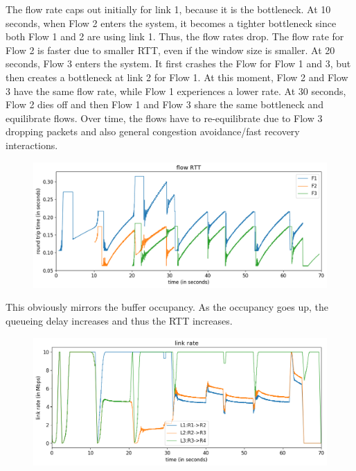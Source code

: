 \documentclass{article}
\begin{document}
The flow rate caps out initially for link 1, because it is the bottleneck. At 10 seconds, when Flow 2 enters the system, it becomes a tighter bottleneck since both Flow 1 and 2 are using link 1. Thus, the flow rates drop. The flow rate for Flow 2 is faster due to smaller RTT, even if the window size is smaller. At 20 seconds, Flow 3 enters the system. It first crashes the Flow for Flow 1 and 3, but then creates a bottleneck at link 2 for Flow 1. At this moment, Flow 2 and Flow 3 have the same flow rate, while Flow 1 experiences a lower rate. At 30 seconds, Flow 2 dies off and then Flow 1 and Flow 3 share the same bottleneck and equilibrate flows.  Over time, the flows have to re-equilibrate due to Flow 3 dropping packets and also general congestion avoidance/fast recovery interactions.

\begin{figure}[H]
\centering
\includegraphics[width = \textwidth]{"test_case2_reno flow RTT"}
\end{figure}

This obviously mirrors the buffer occupancy. As the occupancy goes up, the queueing delay increases and thus the RTT increases.

\begin{figure}[H]
\centering
\includegraphics[width = \textwidth]{"test_case2_reno link rate"}
\end{figure}
\end{document}
